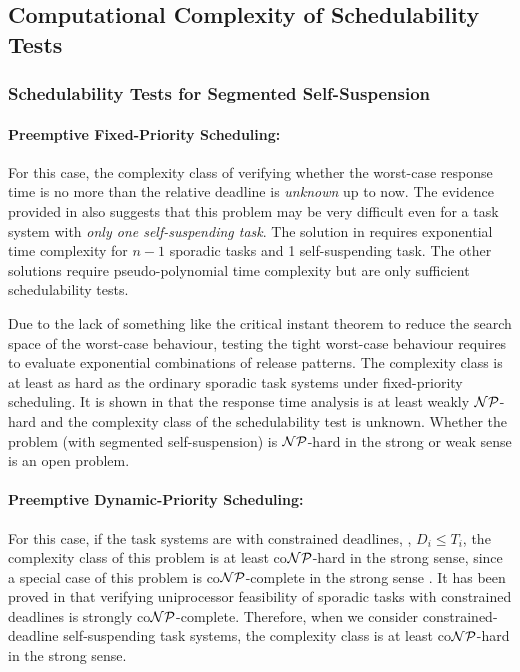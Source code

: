 \subsection{Computational Complexity of Schedulability Tests}

\subsubsection{Schedulability Tests for Segmented Self-Suspension}
\paragraph{Preemptive Fixed-Priority Scheduling:}   
For this case, the complexity class of verifying whether the worst-case response time is no more than the relative deadline is \emph{unknown} up to now. The evidence provided in \cite{ecrts15nelissen} also suggests that this problem may be very difficult even for a task system with \emph{only one self-suspending task}. The solution in \cite{ecrts15nelissen}  requires exponential time complexity for $n-1$ sporadic tasks and 1 self-suspending task. The other solutions \cite{Huang:multiseg}\cite{PH:rtss98} require pseudo-polynomial time complexity but are only sufficient schedulability tests.

Due to 
the lack of something like the critical instant theorem to reduce the search space of the worst-case behaviour, testing the tight worst-case behaviour requires to evaluate exponential combinations of release patterns. The complexity class is at least as hard as the ordinary sporadic task systems under fixed-priority scheduling. It is shown in \cite{EisenbrandR08} that the response time analysis is at least weakly ${\cal NP}$-hard and the complexity class of the schedulability test is unknown.
Whether the problem (with segmented self-suspension) is ${\cal NP}$-hard in the strong or weak sense is an open problem.

\paragraph{Preemptive Dynamic-Priority Scheduling:} 
For this case, if the task systems are with constrained deadlines, \ie, $D_i \leq T_i$, the complexity class of this problem is at least co${\cal NP}$-hard in the strong sense, since a special case of this problem is co${\cal NP}$-complete in the strong sense \cite{DBLP:conf/ecrts/Ekberg015}. It has been proved in \cite{DBLP:conf/ecrts/Ekberg015} that verifying uniprocessor feasibility of sporadic tasks with constrained deadlines is strongly co${\cal NP}$-complete.  Therefore, when we consider constrained-deadline self-suspending task systems, the complexity class is at least co${\cal NP}$-hard in the strong sense.


